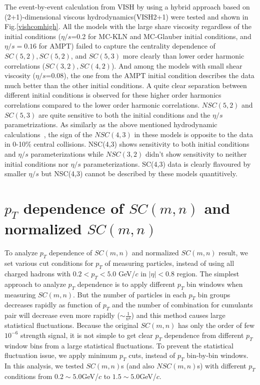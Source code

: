   The event-by-event calculation from VISH by using a hybrid approach based on (2+1)-dimensional viscous hydrodynamics(VISH2+1) were tested and shown in Fig.\ref{vishcomhigh}. All the models with the large share viscosity regardless of the initial conditions ($\eta/s$=0.2 for MC-KLN and MC-Glauber initial conditions, and $\eta/s = 0.16$ for AMPT) failed to capture the centrality dependence of $SC(5,2), SC(5,2)$, and $SC(5,3)$ more clearly than lower order harmonic correlations ($SC(3,2), SC(4,2)$).
And among the models with small shear viscosity ($\eta/s$=0.08), the one from the AMPT initial condition describes the data much better than the other initial conditions. 
A quite clear separation between different initial conditions is observed for these higher order harmonics correlations compared to the lower order harmonic correlations.
$NSC(5,2)$ and $SC(5,3)$ are quite sensitive to both the initial conditions and the $\eta/s$ parametrizations.
As similarly as the above mentioned hydrodynamic calculations~\cite{Niemi:2015qia}, the sign of the $NSC(4,3)$ in these models is opposite to the data in 0-10\% central collisions. NSC(4,3) shows sensitivity to both initial conditions and $\eta/s$ parameterizations while $NSC(3,2)$ didn't show sensitivity to neither initial conditions nor $\eta/s$ parameterizations.
SC(4,3) data is clearly flavoured by smaller $\eta/s$ but NSC(4,3) cannot be described by these models quantitively.






\section{$p_T$ dependence of $SC(m,n)$ and normalized $SC(m,n)$}

To analyze $p_T$ dependence of $SC(m,n)$ and normalized $SC(m,n)$ result, we set various cut conditions for $p_T$ of measuring particles, instead of using all charged hadrons with $0.2 < p_T < 5.0$ GeV/$c$ in $|\eta|<0.8$ region. The simplest approach to analyze $p_T$ dependence is to apply different $p_T$ bin windows when measuring $SC(m,n)$. But the number of particles in each $p_T$ bin groups decreases rapidly as function of $p_T$ and the number of combination for cumulants pair will decrease even more rapidly ($ \sim\frac{1}{n^4}$) and this method causes large statistical fluctuations. Because the original $SC(m,n)$ has only the order of few $10^{-6}$ strength signal, it is not simple to get clear $p_T$ dependence from different $p_T$ window bins from a large statistical fluctuations. To prevent the statistical fluctuation issue, we apply minimum $p_T$ cuts, instead of $p_T$ bin-by-bin windows. In this analysis, we tested $SC(m,n)$s (and also $NSC(m,n)$s) with different $p_T$ conditions from $0.2 \sim 5.0$GeV/$c$ to $1.5 \sim 5.0$GeV/$c$. 

